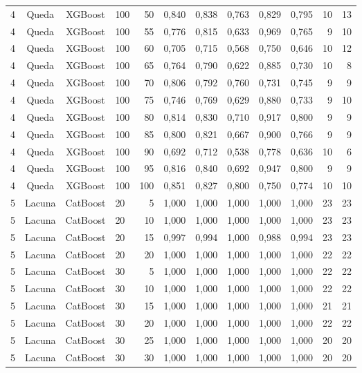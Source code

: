 \begin{longtable}{ccclrrrrrrrr}
4 & Queda & XGBoost & 100 & 50 & 0,840 & 0,838 & 0,763 & 0,829 & 0,795 & 10 & 13 \\
4 & Queda & XGBoost & 100 & 55 & 0,776 & 0,815 & 0,633 & 0,969 & 0,765 & 9 & 10 \\
4 & Queda & XGBoost & 100 & 60 & 0,705 & 0,715 & 0,568 & 0,750 & 0,646 & 10 & 12 \\
4 & Queda & XGBoost & 100 & 65 & 0,764 & 0,790 & 0,622 & 0,885 & 0,730 & 10 & 8 \\
4 & Queda & XGBoost & 100 & 70 & 0,806 & 0,792 & 0,760 & 0,731 & 0,745 & 9 & 9 \\
4 & Queda & XGBoost & 100 & 75 & 0,746 & 0,769 & 0,629 & 0,880 & 0,733 & 9 & 10 \\
4 & Queda & XGBoost & 100 & 80 & 0,814 & 0,830 & 0,710 & 0,917 & 0,800 & 9 & 9 \\
4 & Queda & XGBoost & 100 & 85 & 0,800 & 0,821 & 0,667 & 0,900 & 0,766 & 9 & 9 \\
4 & Queda & XGBoost & 100 & 90 & 0,692 & 0,712 & 0,538 & 0,778 & 0,636 & 10 & 6 \\
4 & Queda & XGBoost & 100 & 95 & 0,816 & 0,840 & 0,692 & 0,947 & 0,800 & 9 & 9 \\
4 & Queda & XGBoost & 100 & 100 & 0,851 & 0,827 & 0,800 & 0,750 & 0,774 & 10 & 10 \\
5 & Lacuna & CatBoost & 20 & 5 & 1,000 & 1,000 & 1,000 & 1,000 & 1,000 & 23 & 23 \\
5 & Lacuna & CatBoost & 20 & 10 & 1,000 & 1,000 & 1,000 & 1,000 & 1,000 & 23 & 23 \\
5 & Lacuna & CatBoost & 20 & 15 & 0,997 & 0,994 & 1,000 & 0,988 & 0,994 & 23 & 23 \\
5 & Lacuna & CatBoost & 20 & 20 & 1,000 & 1,000 & 1,000 & 1,000 & 1,000 & 22 & 22 \\
5 & Lacuna & CatBoost & 30 & 5 & 1,000 & 1,000 & 1,000 & 1,000 & 1,000 & 22 & 22 \\
5 & Lacuna & CatBoost & 30 & 10 & 1,000 & 1,000 & 1,000 & 1,000 & 1,000 & 22 & 22 \\
5 & Lacuna & CatBoost & 30 & 15 & 1,000 & 1,000 & 1,000 & 1,000 & 1,000 & 21 & 21 \\
5 & Lacuna & CatBoost & 30 & 20 & 1,000 & 1,000 & 1,000 & 1,000 & 1,000 & 22 & 22 \\
5 & Lacuna & CatBoost & 30 & 25 & 1,000 & 1,000 & 1,000 & 1,000 & 1,000 & 20 & 20 \\
5 & Lacuna & CatBoost & 30 & 30 & 1,000 & 1,000 & 1,000 & 1,000 & 1,000 & 20 & 20 \\

\end{longtable}
